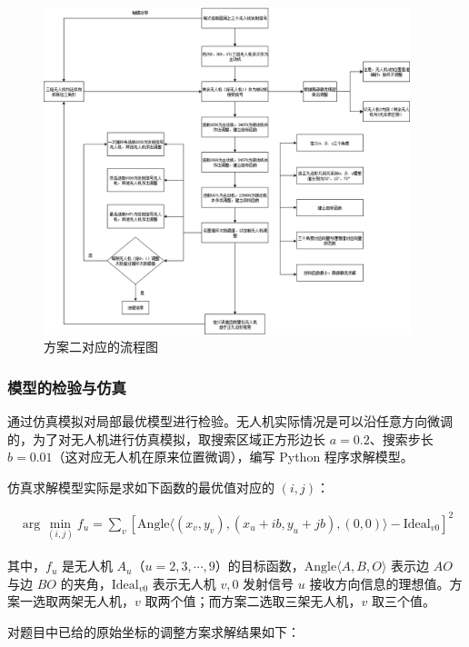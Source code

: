 \documentclass[withoutpreface,bwprint]{cumcmthesis} %
\begin{document}
\begin{figure}[htbp]
    \centering
    \includegraphics[width=0.95\textwidth]{../../figure/q3_2.png} 
    \caption{方案二对应的流程图}
    \label{q3_2}    
\end{figure}


\subsubsection{模型的检验与仿真}
通过仿真模拟对局部最优模型进行检验。无人机实际情况是可以沿任意方向微调的，为了对无人机进行仿真模拟，取搜索区域正方形边长 \( a = 0.2 \)、搜索步长 \( b = 0.01 \)（这对应无人机在原来位置微调），编写 Python 程序求解模型。

仿真求解模型实际是求如下函数的最优值对应的 \( (i,j) \)：

\begin{align}
  \arg\min_{(i,j)} f_u = \sum_v \left[ \text{Angle}\langle (x_v, y_v), (x_u + ib, y_u + jb), (0,0) \rangle - \text{Ideal}_{v0} \right]^2  
\end{align}


其中，\( f_u \) 是无人机 \( A_u \)（\( u = 2,3,\cdots,9 \)）的目标函数，\( \text{Angle}\langle A, B, O \rangle \) 表示边 \( AO \) 与边 \( BO \) 的夹角，\( \text{Ideal}_{v0} \) 表示无人机 \( v,0 \) 发射信号 \( u \) 接收方向信息的理想值。方案一选取两架无人机，\( v \) 取两个值；而方案二选取三架无人机，\( v \) 取三个值。

对题目中已给的原始坐标的调整方案求解结果如下：
\end{document}
